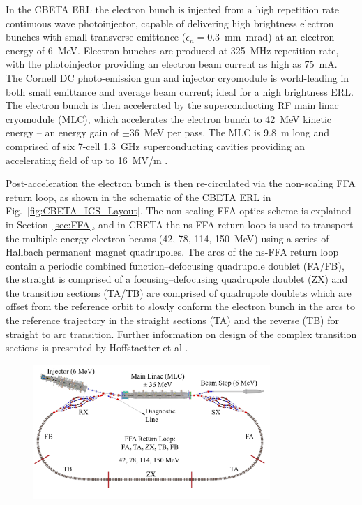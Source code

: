 \documentclass[../main.tex]{subfiles}
\begin{document}
In the CBETA ERL the electron bunch is injected from a high repetition rate continuous wave photoinjector, capable of delivering high brightness electron bunches with small transverse emittance ($\epsilon_{n} = 0.3$~\si{\milli\meter}--\si{\milli\radian}) at an electron energy of 6~\si{\mega\electronvolt}. Electron bunches are produced at 325~\si{\mega\hertz} repetition rate, with the photoinjector providing an electron beam current as high as 75~\si{\milli\ampere}. The Cornell DC photo-emission gun and injector cryomodule is world-leading in both small emittance and average beam current; ideal for a high brightness ERL. The electron bunch is then accelerated by the superconducting RF main linac cryomodule (MLC), which accelerates the electron bunch to 42~\si{\mega\electronvolt} kinetic energy -- an energy gain of $\pm 36$~\si{\mega\electronvolt} per pass. The MLC is 9.8~\si{\meter} long and comprised of six 7-cell 1.3~\si{\giga\hertz} superconducting cavities providing an accelerating field of up to 16~\si{\mega\volt}/\si{\meter} \cite{hoffstaetter2017cbeta}.


Post-acceleration the electron bunch is then re-circulated via the non-scaling FFA return loop, as shown in the schematic of the CBETA ERL in Fig.~\ref{fig:CBETA_ICS_Layout}. The non-scaling FFA optics scheme is explained in Section~\ref{sec:FFA}, and in CBETA the ns-FFA return loop is used to transport the multiple energy electron beams (42, 78, 114, 150~\si{\mega\electronvolt}) using a series of Hallbach permanent magnet quadrupoles. The arcs of the ns-FFA return loop contain a periodic combined function--defocusing quadrupole doublet (FA/FB), the straight is comprised of a focusing--defocusing quadrupole doublet (ZX) and the transition sections (TA/TB) are comprised of quadrupole doublets which are offset from the reference orbit to slowly conform the electron bunch in the arcs to the reference trajectory in the straight sections (TA) and the reverse (TB) for straight to arc transition. Further information on design of the complex transition sections is presented by Hoffstaetter et al \cite{hoffstaetter2017cbeta}.  

\begin{figure}[!h]
\centering
\includegraphics[width=0.8\textwidth]{Figures/CBETA_Multi-Pass_Commissioning/CBETA_4turn.pdf}
\caption{}
\label{fig:CBETA_layout}
\end{figure}
\end{document}
